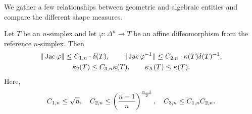 \documentclass[10pt,letterpaper]{article}
\begin{document}
We gather a few relationships between geometric and algebraic entities and compare the different shape measures.


\begin{lemma}\label{lemma:measurerelationships}
    Let $T$ be an $n$-simplex and let $\varphi : \Delta^{n} \rightarrow T$ be an affine diffeomorphism from the reference $n$-simplex. Then 
    \begin{gather*}
        \| \Jacobian \varphi \|
        \leq 
        \Ceins{n} \cdot \diam(T) %
        ,
        \qquad 
        \| \Jacobian \varphi^{-1} \|
        \leq 
        \Czwei{n} \cdot 
        \kappa(T) 
        \diam(T)^{-1}
        ,
        \\
        \kappa_{2}(T)
        \leq 
        \Cdrei{n}
        \kappa(T)
        ,
        \qquad 
        \kappa_{\maxcol}(T)
        \leq 
        \kappa(T)
        .
    \end{gather*}
    Here,
    \begin{align*}
        \Ceins{n} \leq \sqrt{n},
        \quad 
        \Czwei{n} \leq          \left( \frac{n-1}{n} \right)^{\frac{n-1}{2}}, 
        \quad 
        \Cdrei{n} \leq \Ceins{n}\Czwei{n} %
        . 
    \end{align*}
\end{lemma}
\end{document}
